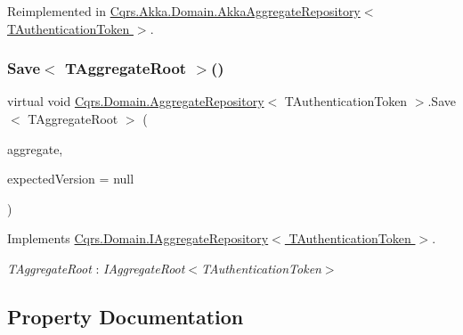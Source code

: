 Reimplemented in \hyperlink{classCqrs_1_1Akka_1_1Domain_1_1AkkaAggregateRepository_a144cbfdedb23039729ba5b3058f84e7a}{Cqrs.\+Akka.\+Domain.\+Akka\+Aggregate\+Repository$<$ T\+Authentication\+Token $>$}.

\mbox{\label{classCqrs_1_1Domain_1_1AggregateRepository_aff9e828d19a091a4275f635bee4b3c9b}} 
\subsubsection{\texorpdfstring{Save$<$ T\+Aggregate\+Root $>$()}{Save< TAggregateRoot >()}}
{\footnotesize\ttfamily virtual void \hyperlink{classCqrs_1_1Domain_1_1AggregateRepository}{Cqrs.\+Domain.\+Aggregate\+Repository}$<$ T\+Authentication\+Token $>$.Save$<$ T\+Aggregate\+Root $>$ (\begin{DoxyParamCaption}\item[{T\+Aggregate\+Root}]{aggregate,  }\item[{int?}]{expected\+Version = {\ttfamily null} }\end{DoxyParamCaption})\hspace{0.3cm}{\ttfamily [virtual]}}



Implements \hyperlink{interfaceCqrs_1_1Domain_1_1IAggregateRepository_a306baf8aa6faabe893f93e5db5d3517d}{Cqrs.\+Domain.\+I\+Aggregate\+Repository$<$ T\+Authentication\+Token $>$}.

\begin{Desc}
\item[Type Constraints]\begin{description}
\item[{\em T\+Aggregate\+Root} : {\em I\+Aggregate\+Root$<$T\+Authentication\+Token$>$}]\end{description}
\end{Desc}


\subsection{Property Documentation}
\mbox{\label{classCqrs_1_1Domain_1_1AggregateRepository_a9c2ffdf87ba242cf0c540f4b0d020777}} 
